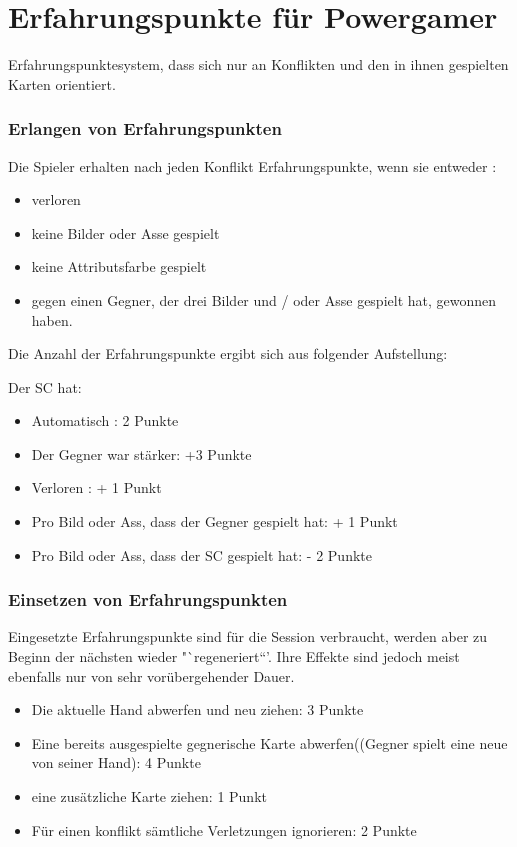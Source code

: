 \section{Erfahrungspunkte für Powergamer}
Erfahrungspunktesystem, dass sich nur an Konflikten und den in ihnen gespielten Karten orientiert.
\subsubsection{Erlangen von Erfahrungspunkten}

Die Spieler erhalten nach jeden Konflikt Erfahrungspunkte, wenn sie entweder :
\begin{itemize}
\item verloren
\item keine Bilder oder Asse gespielt
\item keine Attributsfarbe gespielt
\item gegen einen Gegner, der drei Bilder und / oder Asse gespielt hat, gewonnen haben.
\end{itemize}

Die Anzahl der Erfahrungspunkte ergibt sich aus folgender Aufstellung:

Der SC hat:
\begin{itemize}
\item Automatisch : 2 Punkte
\item Der Gegner war stärker: +3 Punkte
\item Verloren : + 1 Punkt
\item Pro Bild oder Ass, dass der Gegner gespielt hat: + 1 Punkt
\item Pro Bild oder Ass, dass der SC gespielt hat: - 2 Punkte
\end{itemize}

 

\subsubsection{Einsetzen von Erfahrungspunkten}

Eingesetzte Erfahrungspunkte sind für die Session verbraucht, werden aber zu Beginn der nächsten wieder "`regeneriert“'. Ihre Effekte sind jedoch meist ebenfalls nur von sehr vorübergehender Dauer.
\begin{itemize}
\item Die aktuelle Hand abwerfen und neu ziehen: 3 Punkte
\item Eine bereits ausgespielte gegnerische Karte abwerfen((Gegner spielt eine neue von seiner Hand): 4 Punkte
\item eine zusätzliche Karte ziehen: 1 Punkt
\item Für einen konflikt sämtliche Verletzungen ignorieren: 2 Punkte
\end{itemize}

